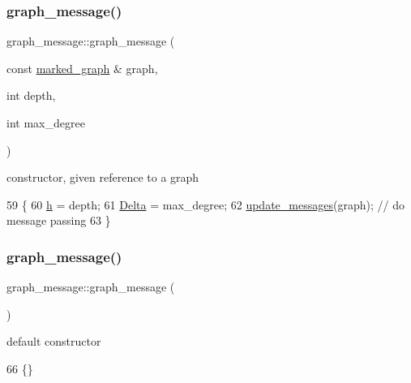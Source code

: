\subsubsection{\texorpdfstring{graph\+\_\+message()}{graph\_message()}\hspace{0.1cm}{\footnotesize\ttfamily [1/2]}}
{\footnotesize\ttfamily graph\+\_\+message\+::graph\+\_\+message (\begin{DoxyParamCaption}\item[{const \hyperlink{classmarked__graph}{marked\+\_\+graph} \&}]{graph,  }\item[{int}]{depth,  }\item[{int}]{max\+\_\+degree }\end{DoxyParamCaption})\hspace{0.3cm}{\ttfamily [inline]}}



constructor, given reference to a graph 


\begin{DoxyCode}
59                                                                      \{
60     \hyperlink{classgraph__message_a934d63ed7275c211e13c6fb68824ed46}{h} = depth;
61     \hyperlink{classgraph__message_a45dfd061b7bc73572e5132fbf66efd55}{Delta} = max\_degree;
62     \hyperlink{classgraph__message_a40dadc59d582b290202e79bc4a9e896c}{update\_messages}(graph); \textcolor{comment}{// do message passing}
63   \}
\end{DoxyCode}
\mbox{\label{classgraph__message_aa21140453eb0e1de98a2ddfcf2832aeb}} 
\subsubsection{\texorpdfstring{graph\+\_\+message()}{graph\_message()}\hspace{0.1cm}{\footnotesize\ttfamily [2/2]}}
{\footnotesize\ttfamily graph\+\_\+message\+::graph\+\_\+message (\begin{DoxyParamCaption}{ }\end{DoxyParamCaption})\hspace{0.3cm}{\ttfamily [inline]}}



default constructor 


\begin{DoxyCode}
66 \{\}
\end{DoxyCode}


